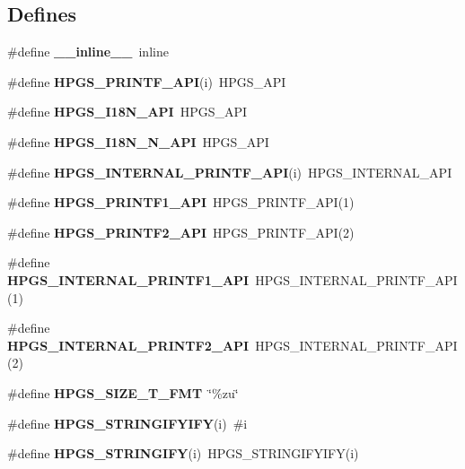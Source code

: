 \subsection*{Defines}
\begin{CompactItemize}
\item 
\#define \textbf{\_\-\_\-inline\_\-\_\-}~inline\label{hpgs_8h_9f04218fe09e6ee659e045b2f11542ed}

\item 
\#define \textbf{HPGS\_\-PRINTF\_\-API}(i)~HPGS\_\-API\label{hpgs_8h_841b8789fdbbdf99423a4a1fd472e6cf}

\item 
\#define \textbf{HPGS\_\-I18N\_\-API}~HPGS\_\-API\label{hpgs_8h_8dd402019b057c0bb79183ee78b386cd}

\item 
\#define \textbf{HPGS\_\-I18N\_\-N\_\-API}~HPGS\_\-API\label{hpgs_8h_ffd075aa3892f19e16a1125ba76a1293}

\item 
\#define \textbf{HPGS\_\-INTERNAL\_\-PRINTF\_\-API}(i)~HPGS\_\-INTERNAL\_\-API\label{hpgs_8h_587752cd1981a07da1cf88299cb96b71}

\item 
\#define \textbf{HPGS\_\-PRINTF1\_\-API}~HPGS\_\-PRINTF\_\-API(1)\label{hpgs_8h_e770da628b9829fdf6dd9a26f8cd4100}

\item 
\#define \textbf{HPGS\_\-PRINTF2\_\-API}~HPGS\_\-PRINTF\_\-API(2)\label{hpgs_8h_16149d9df2a5b43ef9c91bafebbb2ccf}

\item 
\#define \textbf{HPGS\_\-INTERNAL\_\-PRINTF1\_\-API}~HPGS\_\-INTERNAL\_\-PRINTF\_\-API(1)\label{hpgs_8h_35416b7d7d1b18a914e776346ac2312c}

\item 
\#define \textbf{HPGS\_\-INTERNAL\_\-PRINTF2\_\-API}~HPGS\_\-INTERNAL\_\-PRINTF\_\-API(2)\label{hpgs_8h_87a8358970381118710cbc7dfa138082}

\item 
\#define \textbf{HPGS\_\-SIZE\_\-T\_\-FMT}~\char`\"{}\%zu\char`\"{}\label{hpgs_8h_90a47e4f17a389176f98b2702820e9e3}

\item 
\#define \textbf{HPGS\_\-STRINGIFYIFY}(i)~\#i\label{hpgs_8h_6ad6efbf1f5d6adef86e6983ee798753}

\item 
\#define \textbf{HPGS\_\-STRINGIFY}(i)~HPGS\_\-STRINGIFYIFY(i)\label{hpgs_8h_4e456ba5245914a7c5e352e2597ce632}


\end{CompactItemize}

